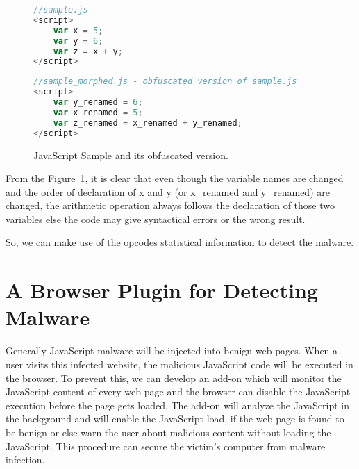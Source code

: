 \begin{figure}
  \centering

\begin{lstlisting}[language=JavaScript]
//sample.js
<script>
    var x = 5;
    var y = 6;
    var z = x + y;
</script>
\end{lstlisting}

\begin{lstlisting}[language=JavaScript]
//sample_morphed.js - obfuscated version of sample.js
<script>
    var y_renamed = 6;
    var x_renamed = 5;
    var z_renamed = x_renamed + y_renamed;
</script>
\end{lstlisting}

    \caption[JavaScript Sample and its obfuscated version.]{JavaScript Sample and its obfuscated version.}
\label{fig:jssample}
\end{figure}

From the Figure~\ref{fig:jssample}, it is clear that even though the variable names are changed and the order of declaration of x and y  (or x\_renamed and y\_renamed) are changed, the arithmetic operation always follows the declaration of those two variables else the code may give syntactical errors or the wrong result.

So, we can make use of the opcodes statistical information to detect the malware. 

\section{A Browser Plugin for Detecting Malware}

Generally JavaScript malware will be injected into benign web pages. When a user visits this infected website, the malicious JavaScript code will be executed in the browser. To prevent this, we can develop an add-on which will monitor the JavaScript content of every web page and the browser can disable the JavaScript execution before the page gets loaded. The add-on will analyze the JavaScript in the background and will enable the JavaScript load, if the web page is found to be benign or else warn the user about malicious content without loading the JavaScript. This procedure can secure the victim's computer from malware infection.